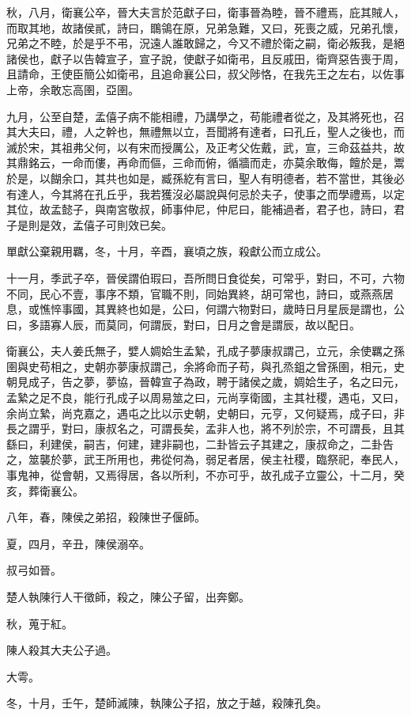 \begin{pinyinscope}
秋，八月，衛襄公卒，晉大夫言於范獻子曰，衛事晉為睦，晉不禮焉，庇其賊人，而取其地，故諸侯貳，詩曰，䳭鴒在原，兄弟急難，又曰，死喪之威，兄弟孔懷，兄弟之不睦，於是乎不弔，況遠人誰敢歸之，今又不禮於衛之嗣，衛必叛我，是絕諸侯也，獻子以告韓宣子，宣子說，使獻子如衛弔，且反戚田，衛齊惡告喪于周，且請命，王使臣簡公如衛弔，且追命襄公曰，叔父陟恪，在我先王之左右，以佐事上帝，余敢忘高圉，亞圉。

九月，公至自楚，孟僖子病不能相禮，乃講學之，苟能禮者從之，及其將死也，召其大夫曰，禮，人之幹也，無禮無以立，吾聞將有達者，曰孔丘，聖人之後也，而滅於宋，其祖弗父何，以有宋而授厲公，及正考父佐戴，武，宣，三命茲益共，故其鼎銘云，一命而僂，再命而傴，三命而俯，循牆而走，亦莫余敢侮，饘於是，鬻於是，以餬余口，其共也如是，臧孫紇有言曰，聖人有明德者，若不當世，其後必有達人，今其將在孔丘乎，我若獲沒必屬說與何忌於夫子，使事之而學禮焉，以定其位，故孟懿子，與南宮敬叔，師事仲尼，仲尼曰，能補過者，君子也，詩曰，君子是則是效，孟僖子可則效已矣。

單獻公棄親用羈，冬，十月，辛酉，襄頃之族，殺獻公而立成公。

十一月，季武子卒，晉侯謂伯瑕曰，吾所問日食從矣，可常乎，對曰，不可，六物不同，民心不壹，事序不類，官職不則，同始異終，胡可常也，詩曰，或燕燕居息，或憔悴事國，其異終也如是，公曰，何謂六物對曰，歲時日月星辰是謂也，公曰，多語寡人辰，而莫同，何謂辰，對曰，日月之會是謂辰，故以配日。

衛襄公，夫人姜氏無子，嬖人婤姶生孟縶，孔成子夢康叔謂己，立元，余使羈之孫圉與史苟相之，史朝亦夢康叔謂己，余將命而子苟，與孔烝鉏之曾孫圉，相元，史朝見成子，告之夢，夢協，晉韓宣子為政，聘于諸侯之歲，婤姶生子，名之曰元，孟縶之足不良，能行孔成子以周易筮之曰，元尚享衛國，主其社稷，遇屯，又曰，余尚立縶，尚克嘉之，遇屯之比以示史朝，史朝曰，元亨，又何疑焉，成子曰，非長之謂乎，對曰，康叔名之，可謂長矣，孟非人也，將不列於宗，不可謂長，且其繇曰，利建侯，嗣吉，何建，建非嗣也，二卦皆云子其建之，康叔命之，二卦告之，筮襲於夢，武王所用也，弗從何為，弱足者居，侯主社稷，臨祭祀，奉民人，事鬼神，從會朝，又焉得居，各以所利，不亦可乎，故孔成子立靈公，十二月，癸亥，葬衛襄公。

八年，春，陳侯之弟招，殺陳世子偃師。

夏，四月，辛丑，陳侯溺卒。

叔弓如晉。

楚人執陳行人干徵師，殺之，陳公子留，出奔鄭。

秋，蒐于紅。

陳人殺其大夫公子過。

大雩。

冬，十月，壬午，楚師滅陳，執陳公子招，放之于越，殺陳孔奐。


\end{pinyinscope}
